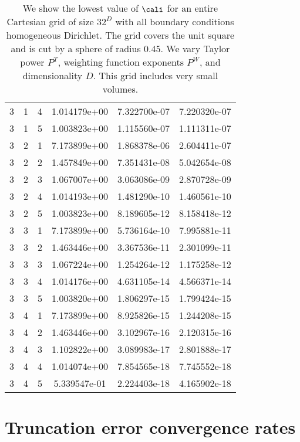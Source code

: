 \documentclass{article}
\begin{document}
{\begin{small}
\begin{table}
\begin{center}
\begin{tabular}{|ccc|ccc|}
3 & 1 & 4 & 1.014179e+00 & 7.322700e-07 & 7.220320e-07 \\ 
3 & 1 & 5 & 1.003823e+00 & 1.115560e-07 & 1.111311e-07 \\ 
3 & 2 & 1 & 7.173899e+00 & 1.868378e-06 & 2.604411e-07 \\ 
3 & 2 & 2 & 1.457849e+00 & 7.351431e-08 & 5.042654e-08 \\ 
3 & 2 & 3 & 1.067007e+00 & 3.063086e-09 & 2.870728e-09 \\ 
3 & 2 & 4 & 1.014193e+00 & 1.481290e-10 & 1.460561e-10 \\ 
3 & 2 & 5 & 1.003823e+00 & 8.189605e-12 & 8.158418e-12 \\ 
3 & 3 & 1 & 7.173899e+00 & 5.736164e-10 & 7.995881e-11 \\ 
3 & 3 & 2 & 1.463446e+00 & 3.367536e-11 & 2.301099e-11 \\ 
3 & 3 & 3 & 1.067224e+00 & 1.254264e-12 & 1.175258e-12 \\ 
3 & 3 & 4 & 1.014176e+00 & 4.631105e-14 & 4.566371e-14 \\ 
3 & 3 & 5 & 1.003820e+00 & 1.806297e-15 & 1.799424e-15 \\ 
3 & 4 & 1 & 7.173899e+00 & 8.925826e-15 & 1.244208e-15 \\ 
3 & 4 & 2 & 1.463446e+00 & 3.102967e-16 & 2.120315e-16 \\ 
3 & 4 & 3 & 1.102822e+00 & 3.089983e-17 & 2.801888e-17 \\ 
3 & 4 & 4 & 1.014074e+00 & 7.854565e-18 & 7.745552e-18 \\ 
3 & 4 & 5 & 5.339547e-01 & 2.224403e-18 & 4.165902e-18 \\ 
\hline
\end{tabular}
\end{center}
\label{fig::unmergedDiri}
\caption
    {
      We show the lowest value of
      $\cali$ for an entire Cartesian grid of size $32^D$ with all
      boundary conditions homogeneous Dirichlet.
      The grid covers the unit square and is cut by a sphere of radius 0.45.
      We vary Taylor power $P^T$, weighting
      function exponents $P^W$, and dimensionality $D$.    This grid
      includes very small volumes.
    }
\end{table}
\end{small}

\section{Truncation error convergence rates}

}
\end{document}
